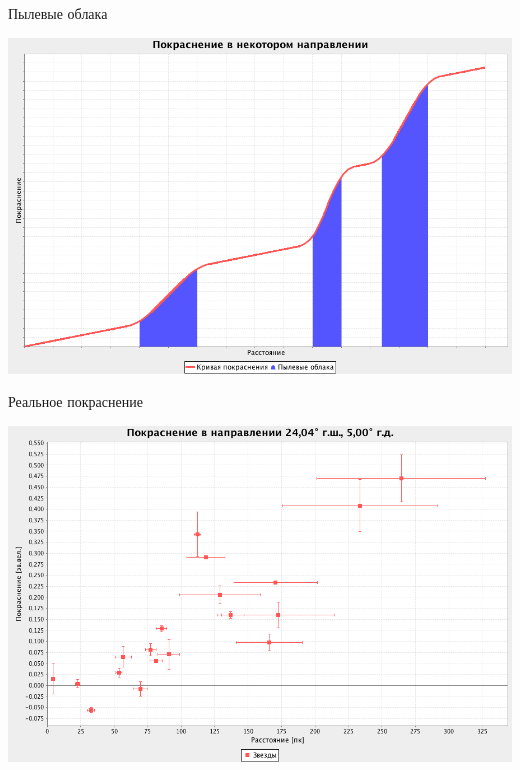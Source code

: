 \documentclass[14pt, fleqn, xcolor={dvipsnames, table}]{beamer}
\begin{document}
        \begin{frame}{Пылевые облака}
            \begin{center}
                \includegraphics[scale=0.35]{ideal-2-no-tick.png}
            \end{center}             
        \end{frame}
        
        \begin{frame}{Реальное покраснение}
            \begin{center}
                \includegraphics[scale=0.35]{real-1.png}
            \end{center}             
        \end{frame}
        
\end{document}
